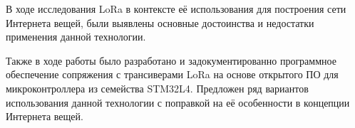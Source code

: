 \Conclusion %

В ходе исследования LoRa в контексте её использования для построения сети Интернета вещей, были выявлены основные достоинства и недостатки применения данной технологии.

Также в ходе работы было разработано и задокументированно программное 
обеспечение сопряжения с трансиверами LoRa на основе открытого ПО для 
микроконтроллера из семейства STM32L4. 
Предложен ряд вариантов использования данной технологии с поправкой на её особенности в концепции Интернета вещей.

